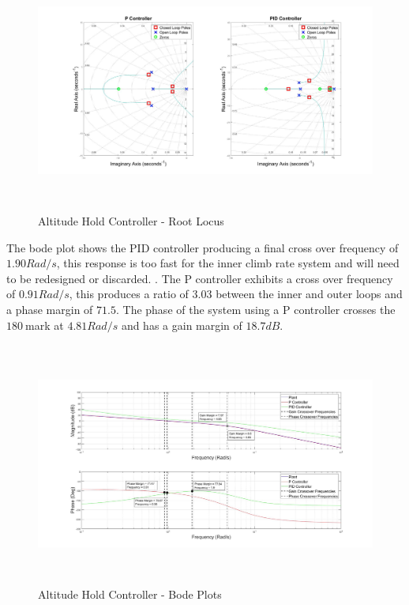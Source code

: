 \documentclass[12pt]{report}
\begin{document}
\begin{figure}[H]
	\centering
	\includegraphics[height = 8cm]{../Design/Matlab/Controllers/altitude_root.jpg}
	\caption{Altitude Hold Controller -  Root Locus}
	\label{IM_AltHoldRoot}
\end{figure}

The bode plot shows the PID controller producing a final cross over frequency of $1.90Rad/s$, this response is too fast for the inner climb rate system and will need to be redesigned or discarded. . The P controller exhibits a cross over frequency of $0.91Rad/s$, this produces a ratio of $3.03$ between the inner and outer loops and a phase margin of $71.5$\textdegree. The phase of the system using a P controller crosses the $180$\textdegree  $\ $mark at $4.81Rad/s$ and has a gain margin of $18.7dB$.

\begin{figure}[H]
	\centering
	\includegraphics[height = 8cm]{../Design/Matlab/Controllers/altitude_bode.jpg}
	\caption{Altitude Hold Controller -  Bode Plots}
	\label{IM_AltHoldBode}
\end{figure}
\end{document}
